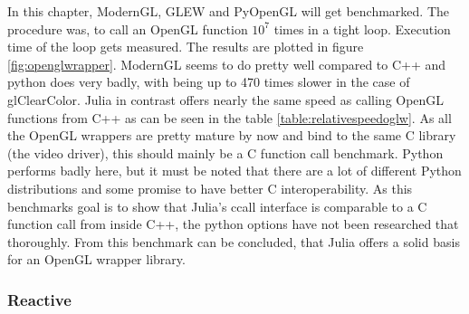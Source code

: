 In this chapter, ModernGL, GLEW and PyOpenGL will get benchmarked.
The procedure was, to call an OpenGL function $10^7$ times in a tight loop. Execution time of the loop gets measured.
The results are plotted in figure \ref{fig:openglwrapper}.
ModernGL seems to do pretty well compared to C++ and python does very badly, with being up to 470 times slower in the case of glClearColor.
Julia in contrast offers nearly the same speed as calling OpenGL functions from C++ as can be seen in the table \ref{table:relativespeedoglw}.
As all the OpenGL wrappers are pretty mature by now and bind to the same C library (the video driver), this should mainly be a C function call benchmark.
Python performs badly here, but it must be noted that there are a lot of different Python distributions and some promise to have better C interoperability.
As this benchmarks goal is to show that Julia’s ccall interface is comparable to a C function call from inside C++, the python options have not been researched that thoroughly.
From this benchmark can be concluded, that Julia offers a solid basis for an OpenGL wrapper library.


\subsubsection{Reactive}

